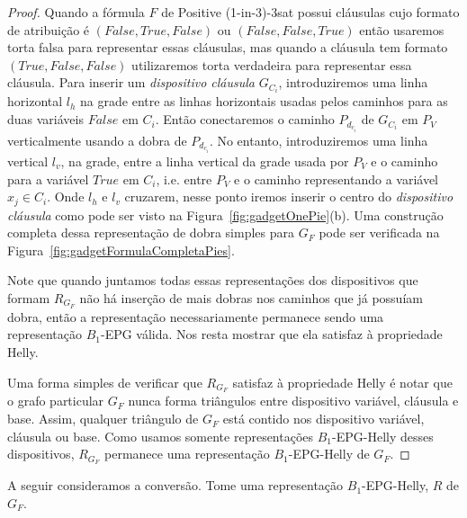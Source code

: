 \begin{proof}
Quando a fórmula  $F$ de {\sc Positive (1-in-3)-3sat} possui cláusulas cujo formato de atribuição é $(False, True, False)$ ou $(False, False, True)$ então usaremos torta falsa para representar essas cláusulas, mas quando a cláusula tem formato  $(True, False, False)$ utilizaremos  torta verdadeira para representar essa cláusula. Para inserir um  \textit{ dispositivo cláusula} $G_{C_i}$, introduziremos uma linha horizontal $l_{h}$ na grade entre as linhas horizontais usadas pelos caminhos para as duas variáveis $False$ em $ C_i $. Então conectaremos o caminho $P_{d_{c_i}}$ de $G_{C_i}$ em $P_{V}$ verticalmente usando a dobra de  $P_{d_{c_i}}$. No entanto, introduziremos uma linha vertical $ l_{v}$, na grade, entre a linha vertical da grade usada por $P_{V}$ e o caminho para  a variável $True$ em $C_i$, i.e. entre $P_{V}$ e o caminho representando a variável  $x_j \in C_i$. Onde  $l_{h}$  e $l_{v}$ cruzarem, nesse ponto iremos inserir o centro do  \textit{dispositivo cláusula} como pode ser visto na Figura~\ref{fig:gadgetOnePie}(b). Uma construção completa dessa representação de dobra simples para  $G_F$ pode ser verificada na 
Figura~\ref{fig:gadgetFormulaCompletaPies}.%

\begin{landscape}

\end{landscape}





Note que quando juntamos todas essas representações  dos  dispositivos que formam $ R_{G_F} $ não há inserção de mais dobras nos caminhos que já possuíam dobra, então a representação necessariamente permanece sendo uma representação  $ B_1$-EPG válida. Nos resta mostrar que ela satisfaz à propriedade Helly. 

Uma forma simples de verificar que $ R_{G_F} $ satisfaz à propriedade Helly é notar que o grafo particular  $G_F$ nunca forma triângulos entre dispositivo variável, cláusula e base. Assim, qualquer triângulo de  $G_F$ está contido nos dispositivo variável, cláusula ou base. Como usamos somente representações  $B_1$-EPG-Helly desses dispositivos, $ R_{G_F} $ permanece uma representação $B_1$-EPG-Helly de $G_F$.
 \end{proof}


A seguir consideramos a conversão. Tome uma representação $B_1$-EPG-Helly, $R$ de $G_F$.

